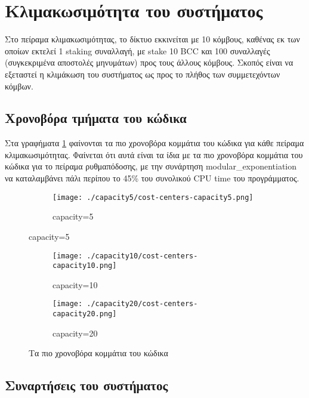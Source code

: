 \documentclass{article}
\newcommand{\eng}[1]{\foreignlanguage{english}{#1}} %
\begin{document}
\clearpage
\section{Κλιμακωσιμότητα του συστήματος}

Στο πείραμα κλιμακωσιμότητας, το δίκτυο εκκινείται με 10 κόμβους, καθένας εκ
των οποίων εκτελεί 1 \eng{staking} συναλλαγή, με \eng{stake 10 BCC} και 100
συναλλαγές (συγκεκριμένα αποστολές μηνυμάτων) προς τους άλλους κόμβους. Σκοπός
είναι να εξεταστεί η κλιμάκωση του συστήματος ως προς το πλήθος των
συμμετεχόντων κόμβων.

\subsection{Χρονοβόρα τμήματα του κώδικα}

Στα γραφήματα \ref{fig:scalability-cost-centers} φαίνονται τα πιο χρονοβόρα
κομμάτια του κώδικα για κάθε πείραμα κλιμακωσιμότητας. Φαίνεται ότι αυτά είναι
τα ίδια με τα πιο χρονοβόρα κομμάτια του κώδικα για το πείραμα ρυθμαπόδοσης, με
την συνάρτηση \eng{modular\_exponentiation} να καταλαμβάνει πάλι περίπου το
45\% του συνολικού \eng{CPU time} του προγράμματος.

\graphicspath{{../experiments/profiled\_outputs/docker/scalability/}}

\begin{figure}[ht]
    \centering
    \begin{subfigure}{\textwidth}
        \texttt{[image: ./capacity5/cost-centers-capacity5.png]}
        \caption{\eng{capacity=5}}
    \end{subfigure}
\end{figure}
\begin{figure}[ht]
    \ContinuedFloat
    \begin{subfigure}{\textwidth}
        \texttt{[image: ./capacity10/cost-centers-capacity10.png]}
        \caption{\eng{capacity=10}}
    \end{subfigure}
    \begin{subfigure}{\textwidth}
        \texttt{[image: ./capacity20/cost-centers-capacity20.png]}
        \caption{\eng{capacity=20}}
    \end{subfigure}
    \caption{Τα πιο χρονοβόρα κομμάτια του κώδικα}
    \label{fig:scalability-cost-centers}
\end{figure}
\FloatBarrier

\subsection{Συναρτήσεις του συστήματος}
\end{document}

